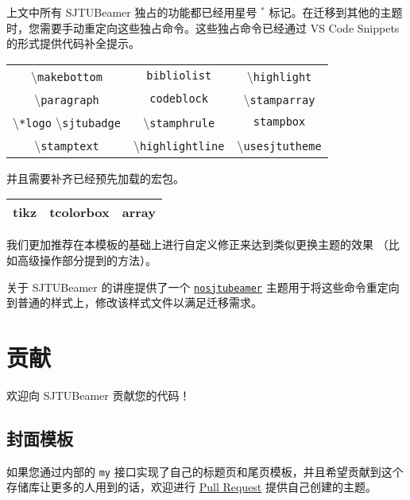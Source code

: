 \documentclass[
    UTF8,
    heading=true,
    12pt,
    a4paper
]{ctexrep}
\newcommand{\cmd}[1]{\textbackslash{}\texttt{#1}}
\newcommand{\cls}[1]{\texttt{#1}}
\newcommand{\env}[1]{\texttt{#1}}
\newcommand{\opt}[1]{\texttt{#1}}
\def\themename{\textsf{SJTUBeamer}}
\begin{document}
上文中所有 \themename{} 独占的功能都已经用星号 $^*$
标记。在迁移到其他的主题时，您需要手动重定向这些独占命令。这些独占命令已经通过 VS Code
Snippets 的形式提供代码补全提示。

\begin{table}[h]
  \centering
  \begin{tabular}{ccc}
    \hline
    \cmd{makebottom}            &
    \env{bibliolist}            & \cmd{highlight}
    \\
    \cmd{paragraph}             & \env{codeblock}
                                &
    \cmd{stamparray}
    \\
    \cmd{*logo} \cmd{sjtubadge} &
    \cmd{stamphrule}            & \env{stampbox}
    \\
    \cmd{stamptext}             &
    \cmd{highlightline}         &
    \cmd{usesjtutheme}
    \\
    \hline
  \end{tabular}
\end{table}

并且需要补齐已经预先加载的宏包。

\begin{table}[h]
  \centering

  \begin{tabular}
    {>{\sffamily}c>{\sffamily}c>{\sffamily}c}
    \hline
    tikz & tcolorbox & array \\
    \hline
  \end{tabular}
\end{table}

我们更加推荐在本模板的基础上进行自定义修正来达到类似更换主题的效果
（比如高级操作部分提到的方法）。

关于 \themename{} 的讲座提供了一个
\href{https://github.com/sjtug/sjtulib-latex-talk/blob/logcreative-2022/beamerthemenosjtubeamer.sty}
{\cls{nosjtubeamer}}
主题用于将这些命令重定向到普通的样式上，修改该样式文件以满足迁移需求。

\chapter{贡献}

欢迎向 \themename{} 贡献您的代码！

\section{封面模板}

如果您通过内部的 \opt{my}
接口实现了自己的标题页和尾页模板，并且希望贡献到这个存储库让更多的人用到的话，欢迎进行
\href{https://github.com/sjtug/SJTUBeamer/pulls}{Pull Request}
提供自己创建的主题。
\end{document}
